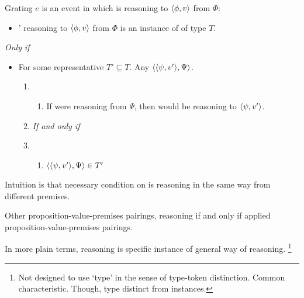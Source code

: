 \begin{note}
  \begin{definition}[\tR{2}]
    \label{def:cmptnc}

    Grating \(e\) is an event in which \vAgent{} is reasoning to \(\langle \phi, v \rangle\) from \(\Phi\):

    \begin{itemize}
    \item
      \vAgent{}' reasoning to \(\langle \phi, v \rangle\) from \(\Phi\) is an instance of \emph{} of type \(T\).
    \end{itemize}

    \emph{Only if}

    \begin{itemize}
    \item
      For some representative \(T' \subseteq T\).
      Any \(\langle \langle \psi, v' \rangle, \Psi \rangle\).

      \begin{enumerate}[label=]
      \item
        \begin{enumerate}[label=\alph*., ref=(\alph*)]
        \item
          If \vAgent{} were reasoning from \(\Psi\), then \vAgent{} would be reasoning to \(\langle \psi, v' \rangle\).
        \end{enumerate}
      \item
        \emph{If and only if}
      \item
        \begin{enumerate}[label=\alph*., ref=(\alph*), resume]
        \item
          \(\langle \langle \psi, v' \rangle, \Psi \rangle \in T'\)
        \end{enumerate}
      \end{enumerate}
    \end{itemize}
    \end{definition}

  Intuition is that necessary condition on \tR{} is reasoning in the same way from different premises.

    Other proposition-value-premises pairings, reasoning if and only if applied proposition-value-premises pairings.

  In more plain terms, reasoning is specific instance of general way of reasoning.%
  \footnote{
    Not designed to use `type' in the sense of type-token distinction.
    Common characteristic.
    Though, type distinct from instances.
  }
\end{note}

